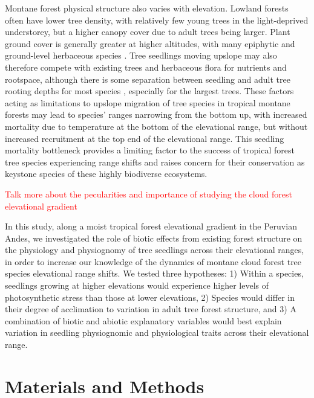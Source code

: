 \documentclass[a4paper, 11pt]{article}
\newcommand{\todo}[1]{\textcolor{red}{#1}}   %
\begin{document}
Montane forest physical structure also varies with elevation. Lowland forests often have lower tree density, with relatively few young trees in the light-deprived understorey, but a higher canopy cover due to adult trees being larger. Plant ground cover is generally greater at higher altitudes, with many epiphytic and ground-level herbaceous species \citep{Martin2010}. Tree seedlings moving upslope may also therefore compete with existing trees and herbaceous flora for nutrients and rootspace, although there is some separation between seedling and adult tree rooting depths for most species \citep{Lewis2000}, especially for the largest trees. These factors acting as limitations to upslope migration of tree species in tropical montane forests may lead to species' ranges narrowing from the bottom up, with increased mortality due to temperature at the bottom of the elevational range, but without increased recruitment at the top end of the elevational range. This seedling mortality bottleneck provides a limiting factor to the success of tropical forest tree species experiencing range shifts and raises concern for their conservation as keystone species of these highly biodiverse ecosystems.

\todo{Talk more about the pecularities and importance of studying the cloud forest elevational gradient}

In this study, along a moist tropical forest elevational gradient in the Peruvian Andes, we investigated the role of biotic effects from existing forest structure on the physiology and physiognomy of tree seedlings across their elevational ranges, in order to increase our knowledge of the dynamics of montane cloud forest tree species elevational range shifts. We tested three hypotheses: 1) Within a species, seedlings growing at higher elevations would experience higher levels of photosynthetic stress than those at lower elevations, 2) Species would differ in their degree of acclimation to variation in adult tree forest structure, and 3) A combination of biotic and abiotic explanatory variables would best explain variation in seedling physiognomic and physiological traits across their elevational range.

\section{Materials and Methods}
\end{document}
